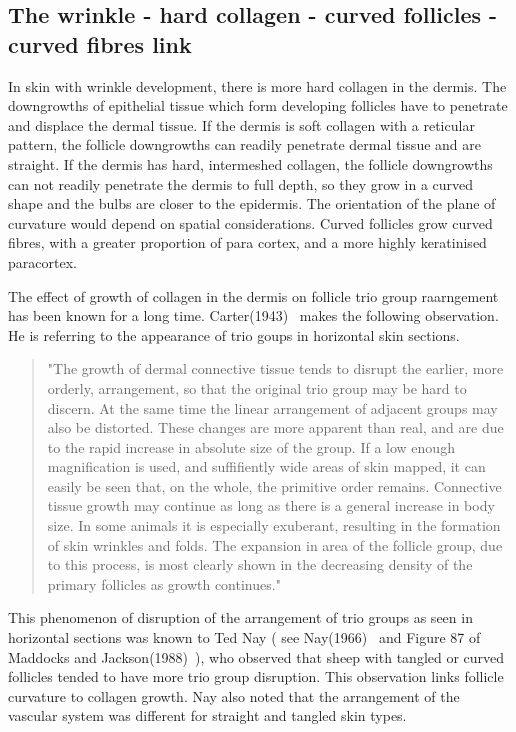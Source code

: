 \documentclass[titlepage]{article}  %
\begin{document}
\subsection{The wrinkle - hard collagen - curved follicles - curved fibres link}
In skin with wrinkle development, there is more hard collagen in the dermis. The downgrowths of epithelial tissue which form developing follicles have to penetrate and displace the dermal tissue. If the dermis is soft collagen with a reticular pattern, the follicle downgrowths can readily penetrate dermal tissue and are straight. If the dermis has hard, intermeshed collagen, the follicle downgrowths can not readily penetrate the dermis to full depth, so they grow in a curved shape and the bulbs are closer to the epidermis.  The orientation of the plane of curvature would depend on spatial considerations. Curved follicles grow curved fibres, with a greater proportion of para cortex, and a more highly keratinised paracortex.

The effect of growth of collagen in the dermis on follicle trio group raarngement has been known for a long time. Carter(1943)~\cite{cart:43} makes the following observation. He is referring to the appearance of trio goups in horizontal skin sections.

\begin{quote}
"The growth of dermal connective tissue tends to disrupt the earlier, more orderly, arrangement, so that the original trio group may be hard to discern. At the same time the linear arrangement of adjacent groups may also be distorted. These changes are more apparent than real, and are due to the rapid increase in absolute size of the group. If a low enough magnification is used, and suffifiently wide areas of skin mapped, it can easily be seen that, on the whole, the primitive order remains. Connective tissue growth may continue as long as there is a general increase in body size. In some animals it is especially exuberant, resulting in the formation of skin wrinkles and folds. The expansion in area of the follicle group, due to this process, is most clearly shown in the decreasing density of the primary follicles as growth continues."
\end{quote}

This phenomenon of disruption of the arrangement of trio groups as seen in horizontal sections was known to Ted Nay ( see Nay(1966)~\cite{nay:66} and Figure 87 of Maddocks and Jackson(1988)~\cite{madd:88}), who observed that sheep with tangled or curved follicles tended to have more trio group disruption. This observation links follicle curvature to collagen growth. Nay also noted that the arrangement of the vascular system was different for straight and tangled skin types.
\end{document}
